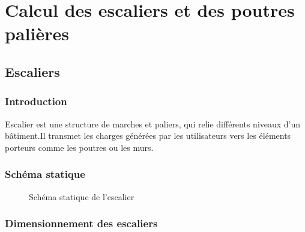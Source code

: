 

\section{Calcul des escaliers et des poutres palières}


\subsection{Escaliers}

\subsubsection{Introduction}

Escalier est une structure de marches et paliers, qui relie différents niveaux
d’un
bâtiment.Il transmet les charges générées par les utilisateurs vers les
éléments porteurs comme les
poutres ou les murs.



\subsubsection{Schéma statique}


\begin{figure}[H]
	\centering
	\caption{Schéma statique de l'escalier}
	\label{fig:schema-statique-escalier}
\end{figure}




\subsubsection{Dimensionnement des escaliers}



